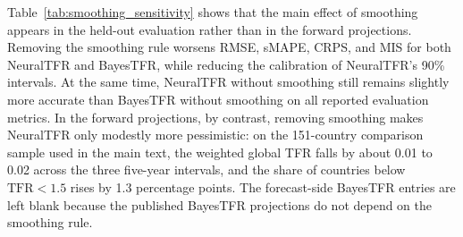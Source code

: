 \documentclass[12pt]{article}
\begin{document}
Table~\ref{tab:smoothing_sensitivity} shows that the main effect of smoothing appears in the held-out evaluation rather than in the forward projections. Removing the smoothing rule worsens RMSE, sMAPE, CRPS, and MIS for both NeuralTFR and BayesTFR, while reducing the calibration of NeuralTFR's 90\% intervals. At the same time, NeuralTFR without smoothing still remains slightly more accurate than BayesTFR without smoothing on all reported evaluation metrics. In the forward projections, by contrast, removing smoothing makes NeuralTFR only modestly more pessimistic: on the 151-country comparison sample used in the main text, the weighted global TFR falls by about 0.01 to 0.02 across the three five-year intervals, and the share of countries below $\mathrm{TFR}<1.5$ rises by 1.3 percentage points. The forecast-side BayesTFR entries are left blank because the published BayesTFR projections do not depend on the smoothing rule.





\end{document}
